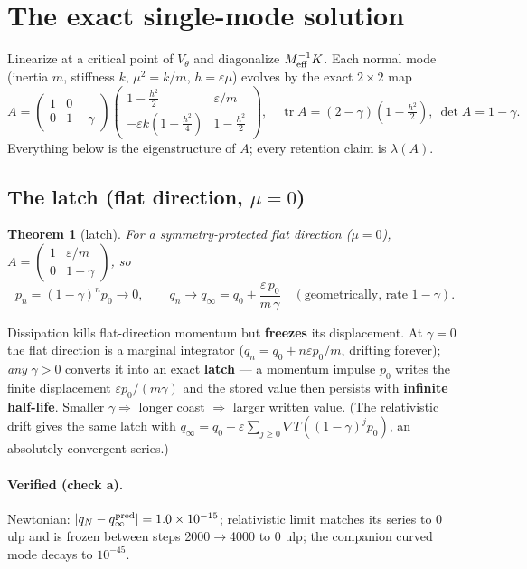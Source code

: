 \documentclass[11pt]{article}
\theoremstyle{plain}
\newtheorem{theorem}{Theorem}
\theoremstyle{definition}
\begin{document}
\section{The exact single-mode solution}
Linearize at a critical point of $V_\theta$ and diagonalize $M_{\rm eff}^{-1}K$. Each normal mode (inertia $m$, stiffness $k$, $\mu^2=k/m$, $h=\varepsilon\mu$) evolves by the exact $2\times2$ map
\begin{equation}
A=\begin{pmatrix}1&0\\0&1-\gamma\end{pmatrix}
\begin{pmatrix}1-\tfrac{h^2}{2} & \varepsilon/m\\[2pt] -\varepsilon k(1-\tfrac{h^2}{4}) & 1-\tfrac{h^2}{2}\end{pmatrix},
\quad \operatorname{tr}A=(2-\gamma)(1-\tfrac{h^2}{2}),\ \det A=1-\gamma.
\end{equation}
Everything below is the eigenstructure of $A$; every retention claim is $\lambda(A)$.

\subsection{The latch (flat direction, $\mu=0$)}
\begin{theorem}[latch]\label{thm:latch}
For a symmetry-protected flat direction ($\mu=0$), $A=\left(\begin{smallmatrix}1&\varepsilon/m\\0&1-\gamma\end{smallmatrix}\right)$, so
\[ p_n=(1-\gamma)^np_0\to0,\qquad q_n\to q_\infty=q_0+\frac{\varepsilon\,p_0}{m\,\gamma}\quad(\text{geometrically, rate }1-\gamma). \]
\end{theorem}
Dissipation kills flat-direction momentum but \textbf{freezes} its displacement. At $\gamma=0$ the flat direction is a marginal integrator ($q_n=q_0+n\varepsilon p_0/m$, drifting forever); \emph{any} $\gamma>0$ converts it into an exact \textbf{latch} --- a momentum impulse $p_0$ writes the finite displacement $\varepsilon p_0/(m\gamma)$ and the stored value then persists with \textbf{infinite half-life}. Smaller $\gamma\Rightarrow$ longer coast $\Rightarrow$ larger written value. (The relativistic drift gives the same latch with $q_\infty=q_0+\varepsilon\sum_{j\ge0}\nabla T((1-\gamma)^jp_0)$, an absolutely convergent series.)

\paragraph{Verified (check a).} Newtonian: $|q_N-q_\infty^{\rm pred}|=1.0\times10^{-15}$; relativistic limit matches its series to 0 ulp and is frozen between steps 2000$\to$4000 to 0 ulp; the companion curved mode decays to $10^{-45}$.
\end{document}
